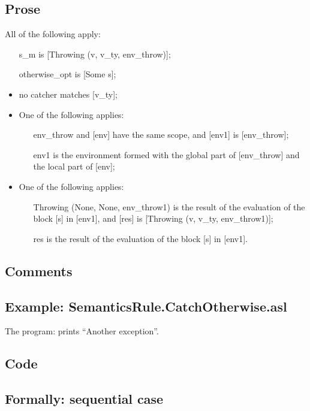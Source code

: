 \documentclass{book}
\begin{document}
    \subsection{Prose}
    All of the following apply:
    \begin{itemize}
    \item [s\_m] is [Throwing (v, v\_ty, env\_throw)];
    \item [otherwise\_opt] is [Some s];
    \item no catcher matches [v\_ty];
    \item One of the following applies:
      \begin{itemize}
      \item [env\_throw] and [env] have the same scope, and [env1] is [env\_throw];
      \item [env1] is the environment formed with the global part of [env\_throw]
        and the local part of [env];
      \end{itemize}
    \item One of the following applies:
      \begin{itemize}
      \item [Throwing (None, None, env\_throw1)] is the result of the evaluation of
        the block [s] in [env1], and [res] is [Throwing (v, v\_ty, env\_throw1)];
      \item [res] is the result of the evaluation of the block [s] in [env1].
      \end{itemize}
    \end{itemize}

    \subsection{Comments}

    \subsection{Example: SemanticsRule.CatchOtherwise.asl}
     The program:
     prints ``Another exception''.

  \subsection{Code}

  \subsection{Formally: sequential case}
  \begin{align}
  \end{align} 
\end{document}
